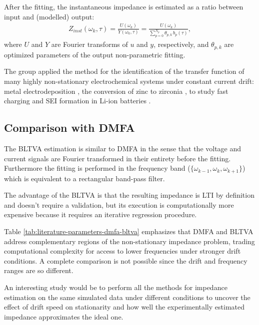 After the fitting, the instantaneous impedance is estimated as a ratio between input and (modelled) output:
\begin{align}\label{eq:bltva_impedance}
    Z_{inst} (\omega_k, \tau) =  \frac{U(\omega_k)}{Y(\omega_k, \tau)} = \frac{U(\omega_k)}{\sum_{p=0}^{N_p} \theta_{p,k}\, b_p(\tau)}, 
\end{align}
where $U$ and $Y$ are Fourier transforms of $u$ and $y$, respectively, and $\theta_{p,k}$ are optimized parameters of the output non-parametric fitting. 

The group applied the method for the identification of the transfer function of many highly non-stationary electrochemical systems under constant current drift: metal electrodeposition \cite{colletOperandoORPEISStudy2021} \cite{dabirihavighOperandoOddRandom2022}, the conversion of zinc to zirconia \cite{dabirihavighOperandoOddRandom2023}, to study fast charging \cite{hallemansOperandoElectrochemicalImpedance2022} and SEI formation in Li-ion batteries \cite{dabirihavighOperandoORPEISMonitoring2025}.

\subsection{Comparison with DMFA}
The BLTVA estimation is similar to DMFA in the sense that the voltage and current signals are Fourier transformed in their entirety before the fitting.
Furthermore the fitting is performed in the frequency band ($\{\omega_{k-1}, \omega_k, \omega_{k+1}\}$) which is equivalent to a rectangular band-pass filter.

The advantage of the BLTVA is that the resulting impedance is LTI by definition and doesn't require a validation, but its execution is computationally more expensive because it requires an iterative regression procedure.

Table \ref{tab:literature-parameters-dmfa-bltva} emphasizes that DMFA and BLTVA address complementary regions of the non-stationary impedance problem, trading computational complexity for access to lower frequencies under stronger drift conditions.
A complete comparison is not possible since the drift and frequency ranges are so different.

An interesting study would be to perform all the methods for impedance estimation on the same simulated data under different conditions to uncover the effect of drift speed on stationarity and how well the experimentally estimated impedance approximates the ideal one.

